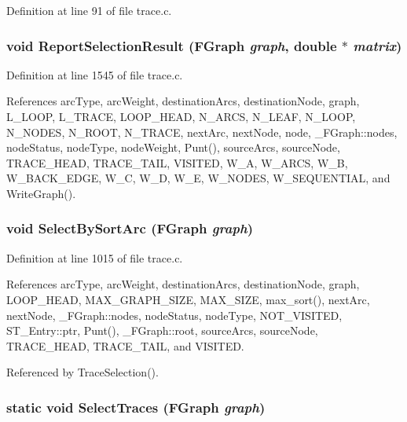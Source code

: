 Definition at line 91 of file trace.c.
\subsubsection{\setlength{\rightskip}{0pt plus 5cm}void Report\-Selection\-Result (\bf{FGraph} {\em graph}, double $\ast$ {\em matrix})}\label{trace_8c_e4fae04de077835aca2c8f6c383f0404}




Definition at line 1545 of file trace.c.

References arc\-Type, arc\-Weight, destination\-Arcs, destination\-Node, graph, L\_\-LOOP, L\_\-TRACE, LOOP\_\-HEAD, N\_\-ARCS, N\_\-LEAF, N\_\-LOOP, N\_\-NODES, N\_\-ROOT, N\_\-TRACE, next\-Arc, next\-Node, node, \_\-FGraph::nodes, node\-Status, node\-Type, node\-Weight, Punt(), source\-Arcs, source\-Node, TRACE\_\-HEAD, TRACE\_\-TAIL, VISITED, W\_\-A, W\_\-ARCS, W\_\-B, W\_\-BACK\_\-EDGE, W\_\-C, W\_\-D, W\_\-E, W\_\-NODES, W\_\-SEQUENTIAL, and Write\-Graph().
\subsubsection{\setlength{\rightskip}{0pt plus 5cm}void Select\-By\-Sort\-Arc (\bf{FGraph} {\em graph})}\label{trace_8c_f69473c3584deec2bb73993e0842584d}




Definition at line 1015 of file trace.c.

References arc\-Type, arc\-Weight, destination\-Arcs, destination\-Node, graph, LOOP\_\-HEAD, MAX\_\-GRAPH\_\-SIZE, MAX\_\-SIZE, max\_\-sort(), next\-Arc, next\-Node, \_\-FGraph::nodes, node\-Status, node\-Type, NOT\_\-VISITED, ST\_\-Entry::ptr, Punt(), \_\-FGraph::root, source\-Arcs, source\-Node, TRACE\_\-HEAD, TRACE\_\-TAIL, and VISITED.

Referenced by Trace\-Selection().
\subsubsection{\setlength{\rightskip}{0pt plus 5cm}static void Select\-Traces (\bf{FGraph} {\em graph})\hspace{0.3cm}{\tt  [static]}}\label{trace_8c_efd694cb38ab97437fb6f6f1e2f1c45e}




